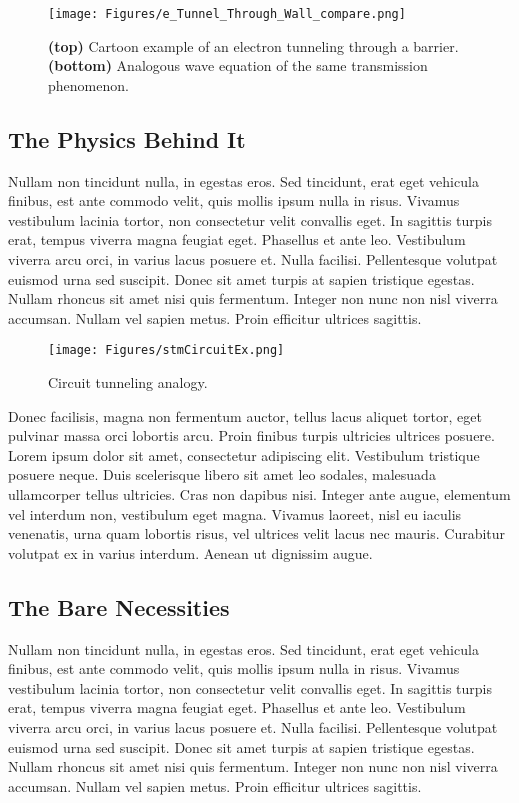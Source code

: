     \begin{figure}
        \centering
        \texttt{[image: Figures/e\_Tunnel\_Through\_Wall\_compare.png]}
        \caption{\textbf{(top)} Cartoon example of an electron tunneling through a barrier. \textbf{(bottom)} Analogous wave equation of the same transmission phenomenon.}
        \label{fig:eTunneling}
    \end{figure}


\subsection{The Physics Behind It}

Nullam non tincidunt nulla, in egestas eros. Sed tincidunt, erat eget vehicula finibus, est ante commodo velit, quis mollis ipsum nulla in risus. Vivamus vestibulum lacinia tortor, non consectetur velit convallis eget. In sagittis turpis erat, tempus viverra magna feugiat eget. Phasellus et ante leo. Vestibulum viverra arcu orci, in varius lacus posuere et. Nulla facilisi. Pellentesque volutpat euismod urna sed suscipit. Donec sit amet turpis at sapien tristique egestas. Nullam rhoncus sit amet nisi quis fermentum. Integer non nunc non nisl viverra accumsan. Nullam vel sapien metus. Proin efficitur ultrices sagittis.

    \begin{figure}
        \centering
        \texttt{[image: Figures/stmCircuitEx.png]}
        \caption{Circuit tunneling analogy. }
        \label{fig:stm}
    \end{figure}

Donec facilisis, magna non fermentum auctor, tellus lacus aliquet tortor, eget pulvinar massa orci lobortis arcu. Proin finibus turpis ultricies ultrices posuere. Lorem ipsum dolor sit amet, consectetur adipiscing elit. Vestibulum tristique posuere neque. Duis scelerisque libero sit amet leo sodales, malesuada ullamcorper tellus ultricies. Cras non dapibus nisi. Integer ante augue, elementum vel interdum non, vestibulum eget magna. Vivamus laoreet, nisl eu iaculis venenatis, urna quam lobortis risus, vel ultrices velit lacus nec mauris. Curabitur volutpat ex in varius interdum. Aenean ut dignissim augue.

\subsection{The Bare Necessities}

Nullam non tincidunt nulla, in egestas eros. Sed tincidunt, erat eget vehicula finibus, est ante commodo velit, quis mollis ipsum nulla in risus. Vivamus vestibulum lacinia tortor, non consectetur velit convallis eget. In sagittis turpis erat, tempus viverra magna feugiat eget. Phasellus et ante leo. Vestibulum viverra arcu orci, in varius lacus posuere et. Nulla facilisi. Pellentesque volutpat euismod urna sed suscipit. Donec sit amet turpis at sapien tristique egestas. Nullam rhoncus sit amet nisi quis fermentum. Integer non nunc non nisl viverra accumsan. Nullam vel sapien metus. Proin efficitur ultrices sagittis.

